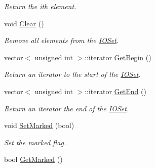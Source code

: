 \begin{DoxyCompactItemize}
\begin{DoxyCompactList}\small\item\em Return the ith element. \item\end{DoxyCompactList}\item 
\hypertarget{class_i_o_set_ad9258715a1cdd1d29453326193ac78d6}{
void \hyperlink{class_i_o_set_ad9258715a1cdd1d29453326193ac78d6}{Clear} ()}
\label{class_i_o_set_ad9258715a1cdd1d29453326193ac78d6}

\begin{DoxyCompactList}\small\item\em Remove all elements from the \hyperlink{class_i_o_set}{IOSet}. \item\end{DoxyCompactList}\item 
\hypertarget{class_i_o_set_a35dbca9814fa6b9d663b73decf446435}{
vector$<$ unsigned int $>$::iterator \hyperlink{class_i_o_set_a35dbca9814fa6b9d663b73decf446435}{GetBegin} ()}
\label{class_i_o_set_a35dbca9814fa6b9d663b73decf446435}

\begin{DoxyCompactList}\small\item\em Return an iterator to the start of the \hyperlink{class_i_o_set}{IOSet}. \item\end{DoxyCompactList}\item 
\hypertarget{class_i_o_set_a7353bb13a1e5726be3aed1eff5d3970d}{
vector$<$ unsigned int $>$::iterator \hyperlink{class_i_o_set_a7353bb13a1e5726be3aed1eff5d3970d}{GetEnd} ()}
\label{class_i_o_set_a7353bb13a1e5726be3aed1eff5d3970d}

\begin{DoxyCompactList}\small\item\em Return an iterator the end of the \hyperlink{class_i_o_set}{IOSet}. \item\end{DoxyCompactList}\item 
\hypertarget{class_i_o_set_adf83505da322e2b78f2d80605e777de6}{
void \hyperlink{class_i_o_set_adf83505da322e2b78f2d80605e777de6}{SetMarked} (bool)}
\label{class_i_o_set_adf83505da322e2b78f2d80605e777de6}

\begin{DoxyCompactList}\small\item\em Set the marked flag. \item\end{DoxyCompactList}\item 
\hypertarget{class_i_o_set_a09d93330dd883be32508b7858c1ec3df}{
bool \hyperlink{class_i_o_set_a09d93330dd883be32508b7858c1ec3df}{GetMarked} ()}
\label{class_i_o_set_a09d93330dd883be32508b7858c1ec3df}


\end{DoxyCompactItemize}
